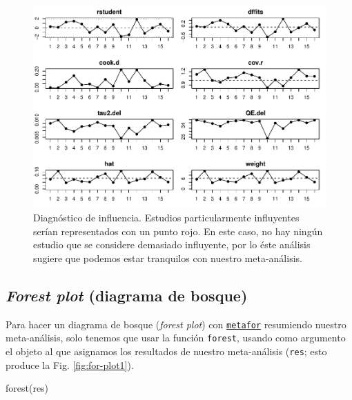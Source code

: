 \documentclass[
  bookmarksnumbered]{article}
\newenvironment{Shaded}{\begin{snugshade}}{\end{snugshade}}
\newcommand{\FunctionTok}[1]{\textcolor[rgb]{0.39,0.29,0.61}{#1}}
\newcommand{\NormalTok}[1]{\textcolor[rgb]{0.12,0.11,0.11}{#1}}
\begin{document}
\begin{figure}
\centering
\includegraphics{Meta-analysis_files/figure-latex/infplot-1.pdf}
\caption{\label{fig:infplot}Diagnóstico de influencia. Estudios particularmente influyentes serían representados con un punto rojo. En este caso, no hay ningún estudio que se considere demasiado influyente, por lo éste análisis sugiere que podemos estar tranquilos con nuestro meta-análisis.}
\end{figure}

\hypertarget{forest-plot-diagrama-de-bosque}{%
\subsection{\texorpdfstring{\emph{Forest plot} (diagrama de bosque)}{Forest plot (diagrama de bosque)}}\label{forest-plot-diagrama-de-bosque}}

Para hacer un diagrama de bosque (\emph{forest plot}) con \href{https://www.metafor-project.org/doku.php}{\texttt{metafor}} resumiendo nuestro meta-análisis, solo tenemos que usar la función \texttt{forest}, usando como argumento el objeto al que asignamos los resultados de nuestro meta-análisis (\texttt{res}; esto produce la Fig. \ref{fig:for-plot1}).

\begin{Shaded}
\begin{Highlighting}[]
\FunctionTok{forest}\NormalTok{(res)}
\end{Highlighting}
\end{Shaded}
\end{document}
